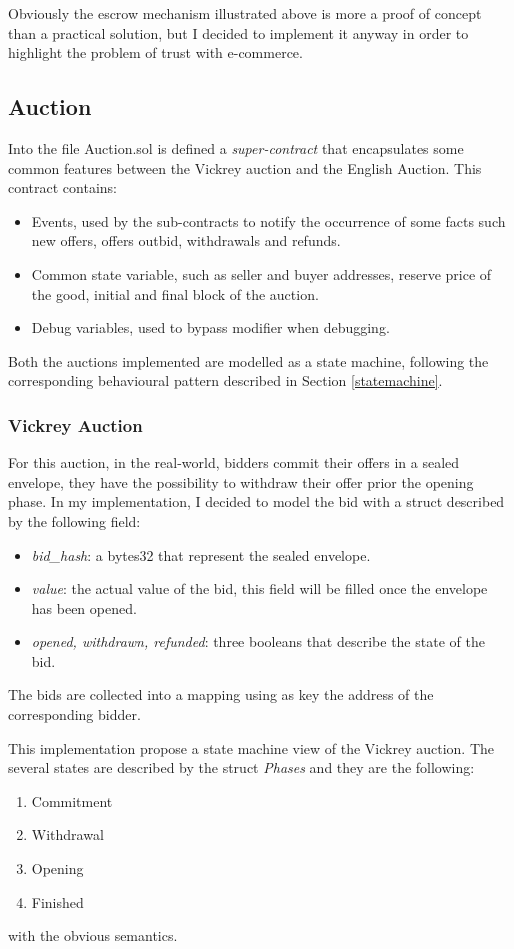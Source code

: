 \documentclass{article}
\begin{document}
Obviously the escrow mechanism illustrated above is more a proof of concept than a practical solution, but I decided to implement it anyway in order to highlight the problem of trust with e-commerce.
\subsection{Auction}
Into the file Auction.sol is defined a \textit{super-contract} that encapsulates some common features between the Vickrey auction and the English Auction.
This contract contains:
\begin{itemize}
    \item Events, used by the sub-contracts to notify the occurrence of some facts such new offers, offers outbid, withdrawals and refunds.
    \item Common state variable, such as seller and buyer addresses, reserve price of the good, initial and final block of the auction.
    \item Debug variables, used to bypass modifier when debugging.
\end{itemize}

Both the auctions implemented are modelled as a state machine, following the corresponding behavioural pattern described in Section \ref{statemachine}.
\subsubsection{Vickrey Auction}\label{vickrey}
For this auction, in the real-world, bidders commit their offers in a sealed envelope, they have the possibility to withdraw their offer prior the opening phase.
In my implementation, I decided to model the bid with a struct described by the following field:
\begin{itemize}
    \item \textit{bid\_hash}: a bytes32 that represent the sealed envelope.
    \item \textit{value}: the actual value of the bid, this field will be filled once the envelope has been opened.
    \item \textit{opened, withdrawn, refunded}: three booleans that describe the state of the bid.
\end{itemize}
The bids are collected into a mapping using as key the address of the corresponding bidder.

This implementation propose a state machine view of the Vickrey auction. The several states are described by the struct \textit{Phases} and they are the following:
\begin{enumerate}
    \item Commitment
    \item Withdrawal
    \item Opening
    \item Finished
\end{enumerate}
with the obvious semantics. 
\end{document}
